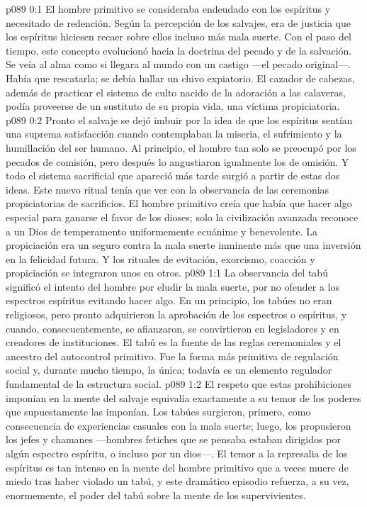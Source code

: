 \author{Brillante estrella vespertina}
\vs p089 0:1 El hombre primitivo se consideraba endeudado con los espíritus y necesitado de redención. Según la percepción de los salvajes, era de justicia que los espíritus hiciesen recaer sobre ellos incluso más mala suerte. Con el paso del tiempo, este concepto evolucionó hacia la doctrina del pecado y de la salvación. Se veía al alma como si llegara al mundo con un castigo ---el pecado original---. Había que rescatarla; se debía hallar un chivo expiatorio. El cazador de cabezas, además de practicar el sistema de culto nacido de la adoración a las calaveras, podía proveerse de un sustituto de su propia vida, una víctima propiciatoria.
\vs p089 0:2 Pronto el salvaje se dejó imbuir por la idea de que los espíritus sentían una suprema satisfacción cuando contemplaban la miseria, el sufrimiento y la humillación del ser humano. Al principio, el hombre tan solo se preocupó por los pecados de comisión, pero después lo angustiaron igualmente los de omisión. Y todo el sistema sacrificial que apareció más tarde surgió a partir de estas dos ideas. Este nuevo ritual tenía que ver con la observancia de las ceremonias propiciatorias de sacrificios. El hombre primitivo creía que había que hacer algo especial para ganarse el favor de los dioses; solo la civilización avanzada reconoce a un Dios de temperamento uniformemente ecuánime y benevolente. La propiciación era un seguro contra la mala suerte inminente más que una inversión en la felicidad futura. Y los rituales de evitación, exorcismo, coacción y propiciación se integraron unos en otros.
\vs p089 1:1 La observancia del tabú significó el intento del hombre por eludir la mala suerte, por no ofender a los espectros espíritus evitando hacer algo. En un principio, los tabúes no eran religiosos, pero pronto adquirieron la aprobación de los espectros o espíritus, y cuando, consecuentemente, se afianzaron, se convirtieron en legisladores y en creadores de instituciones. El tabú es la fuente de las reglas ceremoniales y el ancestro del autocontrol primitivo. Fue la forma más primitiva de regulación social y, durante mucho tiempo, la única; todavía es un elemento regulador fundamental de la estructura social.
\vs p089 1:2 El respeto que estas prohibiciones imponían en la mente del salvaje equivalía exactamente a su temor de los poderes que supuestamente las imponían. Los tabúes surgieron, primero, como consecuencia de experiencias casuales con la mala suerte; luego, los propusieron los jefes y chamanes ---hombres fetiches que se pensaba estaban dirigidos por algún espectro espíritu, o incluso por un dios---. El temor a la represalia de los espíritus es tan intenso en la mente del hombre primitivo que a veces muere de miedo tras haber violado un tabú, y este dramático episodio refuerza, a su vez, enormemente, el poder del tabú sobre la mente de los supervivientes.
